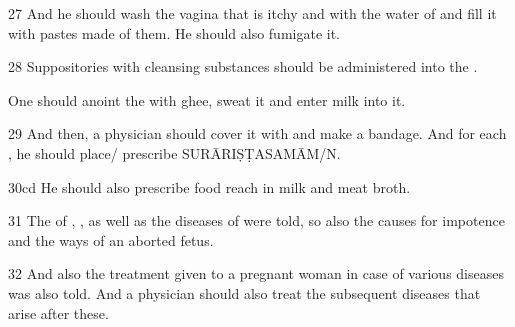 \begin{translation}
\item [27]
And he should wash the vagina that is itchy and  with the water of  and fill it with pastes 
made of them. He should also fumigate it.

\item [28]
Suppositories with cleansing substances should be administered into the 
.

One should anoint the  with ghee, sweat it and enter milk 
into it. 

\item [29] 
And then, a physician should cover it with  and make a bandage. 
And for each , he should place/ prescribe 
SURĀRIṢṬASAMĀM/N.

\item [30cd]
He should also prescribe food reach in milk and meat broth.

\item [31]
The  of , , 
 as well as the diseases of  were told, so also the 
causes for impotence and the ways of an aborted fetus. 

\item [32] 
And also the treatment given to a pregnant woman in case of various diseases 
was also told. And a physician should also treat the subsequent diseases that 
arise after these.  

\end{translation}